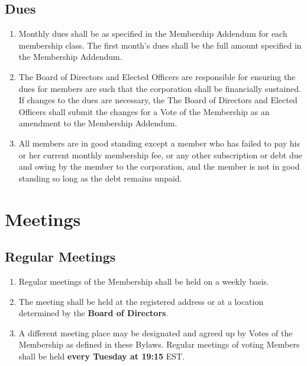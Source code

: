 \documentclass{article}
\begin{document}
\subsection{Dues}
\begin{enumerate}
    \item Monthly dues shall be as specified in the Membership Addendum for each membership class.  The first month’s dues shall be the full amount specified in the Membership Addendum.
    \item The Board of Directors and Elected Officers are responsible for ensuring the dues for members are such that the corporation shall be financially sustained.  If changes to the dues are necessary, the The Board of Directors and Elected Officers shall submit the changes for a Vote of the Membership as an amendment to the Membership Addendum.
    \item All members are in good standing except a member who has failed to pay his or her current monthly membership fee, or any other subscription or debt due and owing by the member to the corporation, and the member is not in good standing so long as the debt remains unpaid.
\end{enumerate}

\section{Meetings}
\subsection{Regular Meetings}
\begin{enumerate}
    \item Regular meetings of the Membership shall be held on a weekly basis.
    \item The meeting shall be held at the registered address or at a location determined by the \textbf{Board of Directors}.
    \item A different meeting place may be designated and agreed up by Votes of the Membership as defined in these Bylaws. Regular meetings of voting Members shall be held \textbf{every Tuesday at 19:15} EST.
\end{enumerate}
\end{document}
